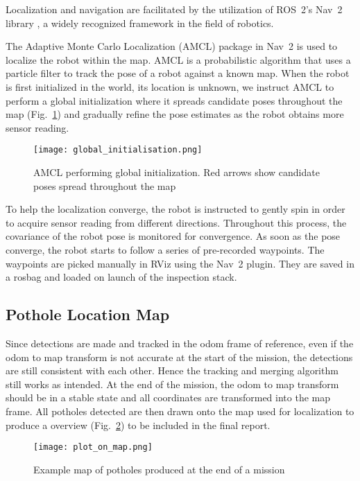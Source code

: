 \documentclass[conference]{IEEEtran}
\begin{document}
Localization and navigation are facilitated by the utilization of ROS~2's Nav~2 library \cite{macenskiMarathonNavigationSystem2020}, a widely recognized framework in the field of robotics.

The Adaptive Monte Carlo Localization (AMCL) package in Nav~2 is used to localize the robot within the map. AMCL is a probabilistic algorithm that uses a particle filter to track the pose of a robot against a known map. When the robot is first initialized in the world, its location is unknown, we instruct AMCL to perform a global initialization where it spreads candidate poses throughout the map (Fig.~\ref{fig:global_initialisation}) and gradually refine the pose estimates as the robot obtains more sensor reading.

\begin{figure}
    \centering
    \texttt{[image: global\_initialisation.png]}
    \caption{AMCL performing global initialization. Red arrows show candidate poses spread throughout the map}
    \label{fig:global_initialisation}
\end{figure}

To help the localization converge, the robot is instructed to gently spin in order to acquire sensor reading from different directions. Throughout this process, the covariance of the robot pose is monitored for convergence. As soon as the pose converge, the robot starts to follow a series of pre-recorded waypoints. The waypoints are picked manually in RViz using the Nav~2 plugin. They are saved in a rosbag and loaded on launch of the inspection stack.

\subsection{Pothole Location Map}

Since detections are made and tracked in the odom frame of reference, even if the odom to map transform is not accurate at the start of the mission, the detections are still consistent with each other. Hence the tracking and merging algorithm still works as intended. At the end of the mission, the odom to map transform should be in a stable state and all coordinates are transformed into the map frame. All potholes detected are then drawn onto the map used for localization to produce a overview (Fig.~\ref{fig:pothole_map}) to be included in the final report.

\begin{figure}
    \centering
    \texttt{[image: plot\_on\_map.png]}
    \caption{Example map of potholes produced at the end of a mission}
    \label{fig:pothole_map}
\end{figure}
\end{document}
